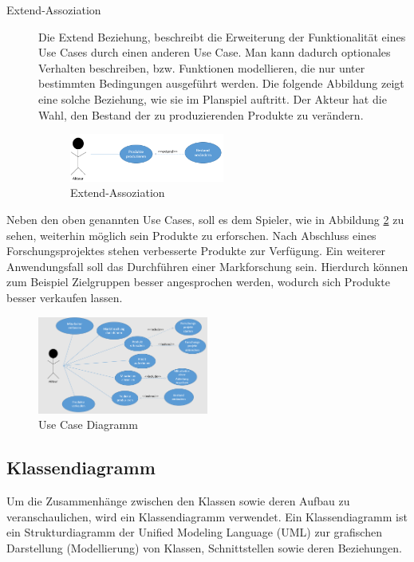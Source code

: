 \begin{description}
\item[Extend-Assoziation]
Die Extend Beziehung, beschreibt die Erweiterung der Funktionalität eines Use Cases durch einen anderen Use Case. Man kann dadurch optionales Verhalten beschreiben, bzw. Funktionen modellieren, die nur unter bestimmten Bedingungen ausgeführt werden. Die folgende Abbildung zeigt eine solche Beziehung, wie sie im Planspiel auftritt. Der Akteur hat die Wahl, den Bestand der zu produzierenden Produkte zu verändern.
\begin{figure}[h]
	\centering	\includegraphics[width=0.5\textwidth]{img/programmentwurf/use_case_extend}
	\captionsetup{format=hang}
	\caption{
		\label{abb:use_case_extend}Extend-Assoziation}
\end{figure}

\end{description}

Neben den oben genannten Use Cases, soll es dem Spieler, wie in Abbildung \ref{abb:usecase} zu sehen, weiterhin möglich sein Produkte zu erforschen. Nach Abschluss eines Forschungsprojektes stehen verbesserte Produkte zur Verfügung.
Ein weiterer Anwendungsfall soll das Durchführen einer Markforschung sein. Hierdurch können zum Beispiel Zielgruppen besser angesprochen werden, wodurch sich Produkte besser verkaufen lassen.

 
\begin{figure}[h]
	\centering	\includegraphics[width=0.5\textwidth]{img/programmentwurf/usecase}
	\captionsetup{format=hang}
	\caption{
		\label{abb:usecase}Use Case Diagramm}
\end{figure}


\subsection{Klassendiagramm}

Um die Zusammenhänge zwischen den Klassen sowie deren Aufbau zu veranschaulichen, wird ein Klassendiagramm verwendet.
Ein Klassendiagramm ist ein Strukturdiagramm der Unified Modeling Language (UML) zur grafischen Darstellung (Modellierung) von Klassen, Schnittstellen sowie deren Beziehungen.

